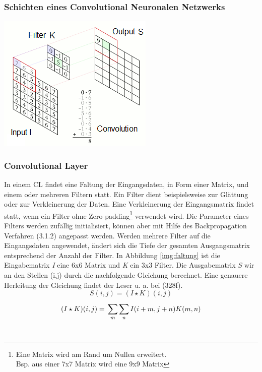 \documentclass[twosided,a4,10pt]{article}
\begin{document}
\begin{multicols}{2}
		\subsubsection{Schichten eines Convolutional Neuronalen Netzwerks}
		\begin{minipage}{0.45\textwidth}
			\centering
			\includegraphics{img/faltung2.png}
			\label{img:faltung}
		\end{minipage}\newline
		\subsubsection*{Convolutional Layer}
		In einem CL findet eine Faltung der Eingangsdaten, in Form einer Matrix, und einem oder mehreren Filtern statt. Ein Filter dient beispielsweise zur Glättung oder zur Verkleinerung der Daten. Eine Verkleinerung der Eingangsmatrix findet statt, wenn ein Filter ohne Zero-padding\footnote[11]{Eine Matrix wird am Rand um Nullen erweitert.\\ Bsp. aus einer 7x7 Matrix wird eine 9x9 Matrix} verwendet wird. Die Parameter eines Filters werden zufällig initialisiert, können aber mit Hilfe des Backpropagation Verfahren (3.1.2) angepasst werden. Werden mehrere Filter auf die Eingangsdaten angewendet, ändert sich die Tiefe der gesamten Ausgangsmatrix entsprechend der Anzahl der Filter. \cite{karpathy}\newline
		In Abbildung \ref{img:faltung} ist die Eingabematrix \textit{I} eine 6x6 Matrix und \textit{K} ein 3x3 Filter. Die Ausgabematrix \textit{S} wir an den Stellen (i,j) durch die nachfolgende Gleichung berechnet. Eine genauere Herleitung der Gleichung findet der Leser u. a. bei \cite{goodfellow}(328f).\newline\\	
		\begin{equation*}
		S(i,j) =(I \star K)(i,j)
		\end{equation*}
		\begin{equation*}
		(I \star K)(i,j) =\newline\sum_{m}^{}\sum_{n}^{}I(i+m,j+n)K(m,n)
		\end{equation*}\newline\\

\end{multicols}
\end{document}

